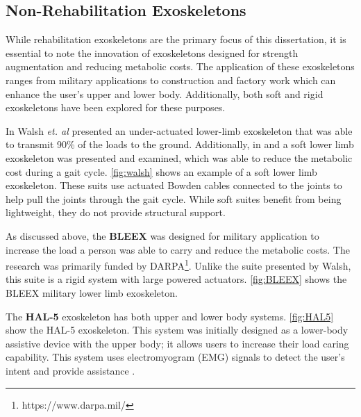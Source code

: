 \subsection{Non-Rehabilitation Exoskeletons}

While rehabilitation exoskeletons are the primary focus of this dissertation, it is essential to note the innovation of exoskeletons designed for strength augmentation and reducing metabolic costs. The application of these exoskeletons ranges from military applications to construction and factory work which can enhance the user's upper and lower body. Additionally, both soft and rigid exoskeletons have been explored for these purposes.

In \cite{walsh2006autonomous} Walsh \textit{et. al} presented an under-actuated lower-limb exoskeleton that was able to transmit 90\% of the loads to the ground. Additionally, in \cite{wehner2013lightweight} and \cite{asbeck2013biologically} a soft lower limb exoskeleton was presented and examined, which was able to reduce the metabolic cost during a gait cycle. \autoref{fig:walsh} shows an example of a soft lower limb exoskeleton. These suits use actuated Bowden cables connected to the joints to help pull the joints through the gait cycle. While soft suites benefit from being lightweight, they do not provide structural support.  



As discussed above, the \textbf{BLEEX} was designed for military application to increase the load a person was able to carry and reduce the metabolic costs. The research was primarily funded by DARPA\footnote{https://www.darpa.mil/}. Unlike the suite presented by Walsh, this suite is a rigid system with large powered actuators. \autoref{fig:BLEEX} shows the BLEEX military lower limb exoskeleton.


The \textbf{HAL-5} exoskeleton has both upper and lower body systems. \autoref{fig:HAL5} show the HAL-5 exoskeleton. This system was initially designed as a lower-body assistive device with the upper body; it allows users to increase their load caring capability. This system uses electromyogram (EMG) signals to detect the user's intent and provide assistance \cite{casolo2008active}.


